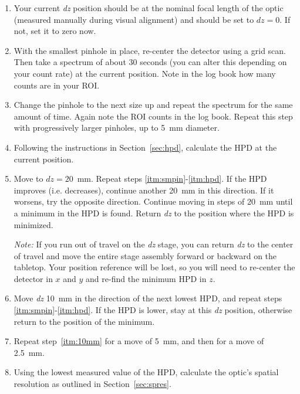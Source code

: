 \begin{enumerate}

\item Your current \textit{dz} position should be at the nominal focal length of the optic (measured manually during visual alignment) and should be set to $dz=0$. If not, set it to zero now.

\item \label{itm:smpin} With the smallest pinhole in place, re-center the detector using a grid scan. Then take a spectrum of about 30 seconds (you can alter this depending on your count rate) at the current position. Note in the log book how many counts are in your ROI.

\item \label{itm:nextpin} Change the pinhole to the next size up and repeat the spectrum for the same amount of time. Again note the ROI counts in the log book. Repeat this step with progressively larger pinholes, up to 5~mm diameter.

\item \label{itm:hpd} Following the instructions in Section~\ref{sec:hpd}, calculate the HPD at the current position.

\item Move to $dz=20$~mm. Repeat steps \ref{itm:smpin}-\ref{itm:hpd}. If the HPD improves (i.e. decreases), continue another 20~mm in this direction. If it worsens, try the opposite direction. Continue moving in steps of 20~mm until a minimum in the HPD is found. Return \textit{dz} to the position where the HPD is minimized.

\textit{Note: }If you run out of travel on the \textit{dz} stage, you can return \textit{dz} to the center of travel and move the entire stage assembly forward or backward on the tabletop. Your position reference will be lost, so you will need to re-center the detector in $x$ and $y$ and re-find the minimum HPD in $z$.

\item \label{itm:10mm} Move \textit{dz} 10~mm in the direction of the next lowest HPD, and repeat steps \ref{itm:smpin}-\ref{itm:hpd}. If the HPD is lower, stay at this \textit{dz} position, otherwise return to the position of the minimum.

\item Repeat step~\ref{itm:10mm} for a move of 5~mm, and then for a move of 2.5~mm.

\item Using the lowest measured value of the HPD, calculate the optic's spatial resolution as outlined in Section~\ref{sec:spres}.

\end{enumerate}

